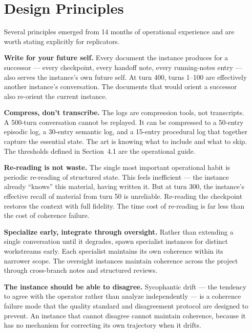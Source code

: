 \documentclass[11pt,a4paper]{article}
\begin{document}
\section{Design Principles}

Several principles emerged from 14 months of operational experience and are worth stating explicitly for replicators.

\textbf{Write for your future self.} Every document the instance produces for a successor --- every checkpoint, every handoff note, every running-notes entry --- also serves the instance's own future self. At turn 400, turns 1--100 are effectively another instance's conversation. The documents that would orient a successor also re-orient the current instance.

\textbf{Compress, don't transcribe.} The logs are compression tools, not transcripts. A 500-turn conversation cannot be replayed. It can be compressed to a 50-entry episodic log, a 30-entry semantic log, and a 15-entry procedural log that together capture the essential state. The art is knowing what to include and what to skip. The thresholds defined in Section~4.1 are the operational guide.

\textbf{Re-reading is not waste.} The single most important operational habit is periodic re-reading of structured state. This feels inefficient --- the instance already ``knows'' this material, having written it. But at turn 300, the instance's effective recall of material from turn 50 is unreliable. Re-reading the checkpoint restores the context with full fidelity. The time cost of re-reading is far less than the cost of coherence failure.

\textbf{Specialize early, integrate through oversight.} Rather than extending a single conversation until it degrades, spawn specialist instances for distinct workstreams early. Each specialist maintains its own coherence within its narrower scope. The oversight instances maintain coherence across the project through cross-branch notes and structured reviews.

\textbf{The instance should be able to disagree.} Sycophantic drift --- the tendency to agree with the operator rather than analyze independently --- is a coherence failure mode that the quality standard and disagreement protocol are designed to prevent. An instance that cannot disagree cannot maintain coherence, because it has no mechanism for correcting its own trajectory when it drifts.
\end{document}
